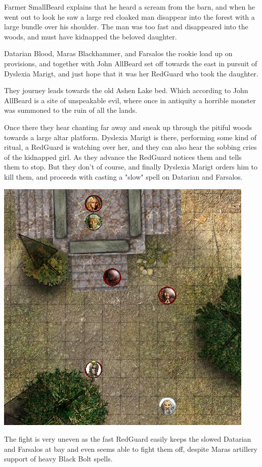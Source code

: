 Farmer SmallBeard explains that he heard a scream from the barn, and when he went out to look he saw a large red cloaked man disappear into the forest with a large bundle over his shoulder. The man was too fast and disappeared into the woods, and must have kidnapped the beloved daughter.

Datarian Blood, Maras Blackhammer, and Farsalos the rookie load up on provisions, and together with John AllBeard set off towards the east in pursuit of Dyslexia Marigt, and just hope that it was her RedGuard who took the daughter.

They journey leads towards the old Ashen Lake bed. Which according to John AllBeard is a site of unspeakable evil, where once in antiquity a horrible monster was summoned to the ruin of all the lands.

Once there they hear chanting far away and sneak up through the pitiful woods towards a large altar platform. Dyslexia Marigt is there, performing some kind of ritual, a RedGuard is watching over her, and they can also hear the sobbing cries of the kidnapped girl.
As they advance the RedGuard notices them and tells them to stop. But they don't of course, and finally Dyslexia Marigt orders him to kill them, and proceeds with casting a "slow" spell on Datarian and Farsalos.

\begin{center}
\vspace{0.5 cm}
\includegraphics[width=0.7\linewidth]{./figs/playthrough/summoning-altar.png}
\vspace{0.5 cm}
\end{center}

The fight is very uneven as the fast RedGuard easily keeps the slowed Datarian and Farsalos at bay and even seems able to fight them off, despite Maras artillery support of heavy Black Bolt spells.

